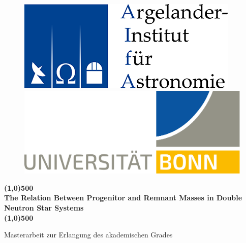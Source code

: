 \documentclass[a4paper, 11pt, twoside]{book}
\def\title{The Relation Between Progenitor and Remnant Masses in Double Neutron Star Systems}
\begin{document}
    \frontmatter  %

    
    \begin{titlepage}
    	\begin{figure}[!t]
        
    		\begin{minipage}{.5\textwidth}    
            	\includegraphics[scale=1.6]{../figures/aifa_logo.png}
    		\end{minipage}%
    		\begin{minipage}{0.5\textwidth}
        		\hspace{2.5cm} \includegraphics[scale=0.17]{../figures/uni_logo.png}
		    \end{minipage}
	\end{figure}
 		  
       
        \begin{center} 

            \LARGE
            \textbf{\line(1,0){500}\\ \title \\ \line(1,0){500}}
            
            \vspace{1cm}
            \Large
            Masterarbeit zur Erlangung des akademischen Grades
            
            \vspace{0.3cm}
            

\end{center}
\end{titlepage}
\end{document}
